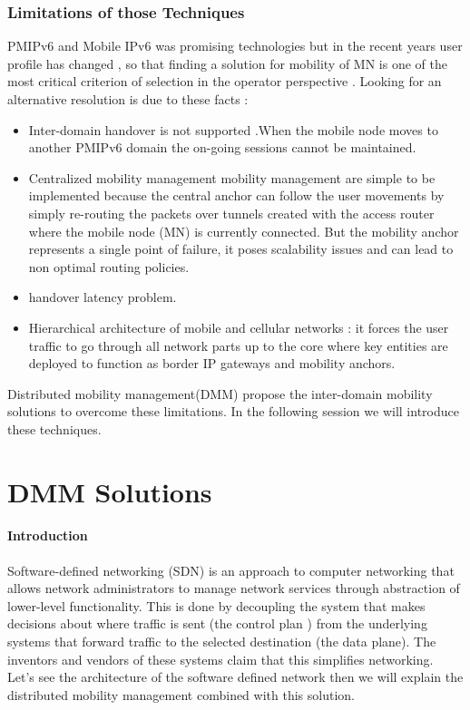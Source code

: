 \documentclass{article}
\begin{document}
\subsubsection{Limitations of those Techniques}

PMIPv6 and Mobile IPv6 was promising technologies but in the recent
years user profile has changed , so that finding a solution for
mobility of MN is one of the most critical criterion of selection in
the operator perspective . Looking for an alternative resolution is
due to these facts :
\begin{itemize}

  \item 
Inter-domain handover is not supported .When the mobile node moves to
another PMIPv6 domain the on-going sessions cannot be maintained.
  \item 
Centralized mobility management mobility management are simple to be
implemented because the central anchor can follow the user movements
by simply re-routing the packets over tunnels created with the access
router where the mobile node (MN) is currently connected.  But the
mobility anchor represents a single point of failure, it poses
scalability issues and can lead to non optimal routing policies.
  \item  
handover latency problem.
  \item  
Hierarchical architecture of mobile and cellular networks : it forces
the user traffic to go through all network parts up to the core where
key entities are deployed to function as border IP gateways and
mobility anchors.
\end{itemize}

Distributed mobility management(DMM) propose the inter-domain mobility
solutions to overcome these limitations. In the following session we
will introduce these techniques.

\section{DMM Solutions}

\paragraph{Introduction}
Software-defined networking (SDN) is an approach to computer
networking that allows network administrators to manage network
services through abstraction of lower-level functionality. This is
done by decoupling the system that makes decisions about where traffic
is sent (the control plan ) from the underlying systems that forward
traffic to the selected destination (the data plane). The inventors
and vendors of these systems claim that this simplifies networking.\\
\newline
Let's see the architecture of the software defined network then we
will explain the distributed mobility management combined with this
solution.
\end{document}
